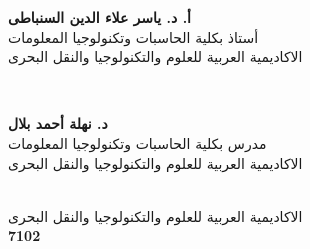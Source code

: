 \documentclass[12pt]{llncs}
\begin{document}
{\begin{titlepage}
\begin{minipage}{0.45\textwidth}
\begin{flushleft}
\center
{\large \bfseries 
أ. د. ياسر علاء الدين السنباطى
}\\
{
أستاذ بكلية الحاسبات وتكنولوجيا المعلومات
}\\
{
الاكاديمية العربية للعلوم والتكنولوجيا والنقل البحرى
}
\end{flushleft}
\end{minipage}
~
\begin{minipage}{0.47\textwidth}
\begin{flushright}
\center
{\large \bfseries 
د. نهلة أحمد بلال
}\\
{
مدرس بكلية الحاسبات وتكنولوجيا المعلومات
}\\
{
الاكاديمية العربية للعلوم والتكنولوجيا والنقل البحرى
}
\end{flushright}
\end{minipage}\\[0.5cm]
{
 الاكاديمية العربية للعلوم والتكنولوجيا والنقل البحرى
}\\[0.1cm] 
{\bfseries
 7102
}\\[0cm] 

\vfill %
\end{titlepage}
}


\end{document}
